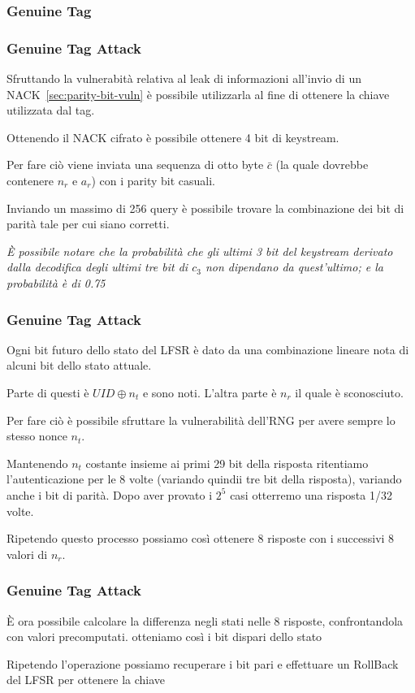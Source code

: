 \subsubsection{Genuine Tag}
\begin{frame}
    \frametitle{Genuine Tag Attack}
    Sfruttando la vulnerabità relativa al leak di informazioni all'invio di un NACK~\ref{sec:parity-bit-vuln} è possibile utilizzarla al fine di ottenere 
    la chiave utilizzata dal tag.\pause

    Ottenendo il NACK cifrato è possibile ottenere 4 bit di keystream.\pause

    Per fare ciò viene inviata una sequenza di otto byte $\bar{c}$ (la quale dovrebbe contenere $n_r$ e $a_r$) con i parity bit casuali.\pause

    Inviando un massimo di 256 query è possibile trovare la combinazione dei bit di parità tale per cui siano corretti.\pause

    \textit{È possibile notare che la probabilità che gli ultimi 3 bit del keystream derivato dalla decodifica degli ultimi tre bit di $c_3$ non dipendano da quest'ultimo; e la probabilità è di 0.75 }\cite{Courtois2009TheDS}
\end{frame}

\begin{frame}
    \frametitle{Genuine Tag Attack}
    Ogni bit futuro dello stato del LFSR è dato da una combinazione lineare nota di alcuni bit dello stato attuale.

    Parte di questi è $UID \oplus n_t$ e sono noti. L'altra parte è $n_r$ il quale è sconosciuto.\pause
    
    Per fare ciò è possibile sfruttare la vulnerabilità dell'RNG per avere sempre lo stesso nonce $n_t$.

    Mantenendo $n_t$ costante insieme ai primi 29 bit della risposta ritentiamo l'autenticazione per le 8 volte 
    (variando quindii tre bit della risposta), variando anche i bit di parità. Dopo aver provato i $2^5$ casi otterremo una risposta 1/32 volte. \pause

    Ripetendo questo processo possiamo così ottenere 8 risposte con i successivi 8 valori di $n_r$.
\end{frame}

\begin{frame}
    \frametitle{Genuine Tag Attack}
    È ora possibile calcolare la differenza negli stati nelle 8 risposte, confrontandola con valori precomputati. otteniamo così i bit dispari dello stato \pause

    Ripetendo l'operazione possiamo recuperare i bit pari e effettuare un RollBack del LFSR per ottenere la chiave
\end{frame}



